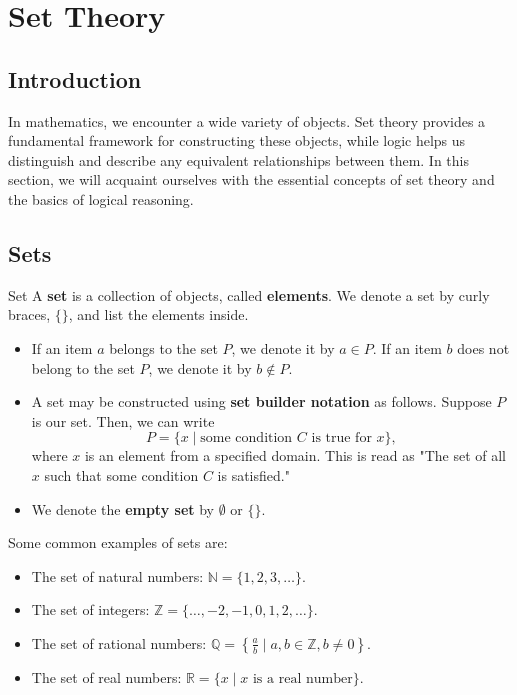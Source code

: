 
\chapter{Set Theory}

\section{Introduction}

In mathematics, we encounter a wide variety of objects. Set theory provides a fundamental framework for constructing these objects, while logic helps us distinguish and describe any equivalent relationships between them. In this section, we will acquaint ourselves with the essential concepts of set theory and the basics of logical reasoning.
\newline
\section{Sets}

\begin{definitionbox}{Set}
A \textbf{set} is a collection of objects, called \textbf{elements}. We denote a set by curly braces, \(\{\}\), and list the elements inside.

\begin{itemize}
    \item If an item \(a\) belongs to the set \(P\), we denote it by \(a \in P\). If an item \(b\) does not belong to the set \(P\), we denote it by \(b \notin P\).
    
    \item A set may be constructed using \textbf{set builder notation} as follows. Suppose \(P\) is our set. Then, we can write
    \[
    P = \{x \mid \text{some condition } C \text{ is true for } x\},
    \]
    where \(x\) is an element from a specified domain. This is read as "The set of all \(x\) such that some condition \(C\) is satisfied."

    \item We denote the \textbf{empty set} by \(\emptyset\) or \(\{\}\).
\end{itemize}
\end{definitionbox}


\begin{example}
\samepage
Some common examples of sets are:
\begin{itemize}
    \item The set of natural numbers: \(\mathbb{N} = \{1, 2, 3, \ldots\}\).
    \item The set of integers: \(\mathbb{Z} = \{\ldots, -2, -1, 0, 1, 2, \ldots\}\).
    \item The set of rational numbers: \(\mathbb{Q} = \left\{\frac{a}{b} \mid a, b \in \mathbb{Z}, b \neq 0\right\}\).
    \item The set of real numbers: \(\mathbb{R} = \{x \mid x \text{ is a real number}\}\).
\end{itemize}
\end{example}

